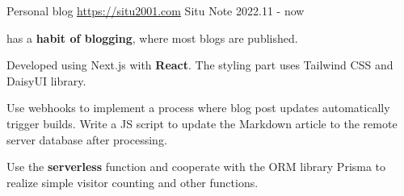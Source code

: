 
\begin{cventries}



\cventry
     {Personal blog \href{https://situ2001.com}{https://situ2001.com}} %
     {Situ Note} %
     {} %
     {2022.11 - now} %
     {
     \begin{cvitems} %
         \item {has a \textbf{habit of blogging}, where most blogs are published. }
         \item{Developed using Next.js with \textbf{React}. The styling part uses Tailwind CSS and DaisyUI library. }
         \item {Use webhooks to implement a process where blog post updates automatically trigger builds. Write a JS script to update the Markdown article to the remote server database after processing. }
         \item {Use the \textbf{serverless} function and cooperate with the ORM library Prisma to realize simple visitor counting and other functions. }
     \end{cvitems}
     }

\end{cventries}